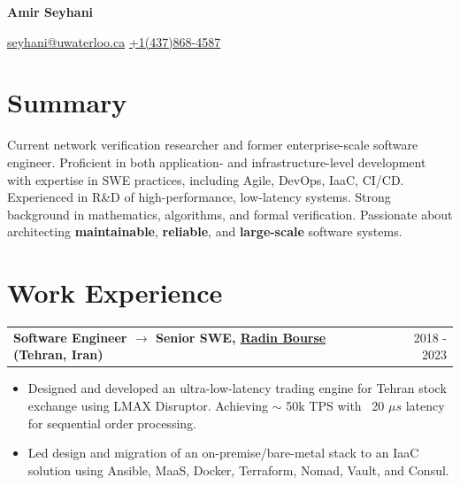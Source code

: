 \documentclass[a4paper,12pt]{article}
\makeatletter
\newenvironment{jobshort}[2]
{
    \begin{tabularx}{\linewidth}{@{}l X r@{}}
        \textbf{#1} & \hfill &  #2 \\[3.75pt]
    \end{tabularx}
    }
    {
}
\makeatother
\begin{document}
    \noindent
    \begin{minipage}[t]{0.50\textwidth} %
    {\Huge \textbf{Amir Seyhani}}
    \end{minipage}%
    \hfill
    \begin{minipage}[t]{0.5\textwidth} %
        \raggedleft
        \small
        \href{mailto:seyhani@uwaterloo.ca}{seyhani@uwaterloo.ca}
        \textbar
        \hspace{0.05em}
        \href{tel:+14378684587}{+1(437)868-4587}
        \textbar
        \hspace{0.05em}
        \href{https://github.com/seyhani}{\faGithub}
        \textbar
        \hspace{0.05em}
        \href{https://www.linkedin.com/in/aseyhani}{\faLinkedin}
        \textbar
        \hspace{0.05em}
        \href{https://scholar.google.com}{\faGraduationCap} \\
    \end{minipage}

    \pagestyle{empty}
    \section{Summary}
    Current network verification researcher and former enterprise-scale software engineer. Proficient in both application- and infrastructure-level development with expertise in SWE practices, including Agile, DevOps, IaaC, CI/CD. Experienced in R\&D of high-performance, low-latency systems. Strong background in mathematics, algorithms, and formal verification. Passionate about architecting \textbf{maintainable}, \textbf{reliable}, and \textbf{large-scale} software systems.

    \section{Work Experience}

    \begin{jobshort}{Software Engineer $\rightarrow$ Senior SWE, \href{https://www.linkedin.com/company/radin-bourse/}{Radin Bourse} (Tehran, Iran)}{2018 - 2023}
        \vspace{-20pt}
        \begin{itemize}[leftmargin=*, nosep]
            \item  Designed and developed an ultra-low-latency trading engine for Tehran stock exchange using LMAX Disruptor. Achieving $\sim$ 50k TPS  with ~20 $\mu s$ latency for sequential order processing.
            \item  Led design and migration of an on-premise/bare-metal stack to an IaaC solution using Ansible, MaaS, Docker, Terraform, Nomad, Vault, and Consul.
        \end{itemize}
    \end{jobshort}
\end{document}
